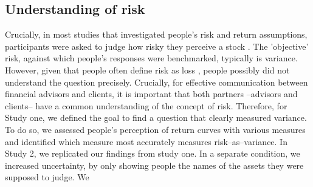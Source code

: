 \documentclass[a4paper,man, natbib,floatsintext]{apa6} %
\begin{document}
\subsection{Understanding of risk}
Crucially, in most studies that investigated people's risk and return assumptions, participants were asked to judge how risky they perceive a stock \citep[e.g.,][]{Kempf2014}. The 'objective' risk, against which people's responses were benchmarked, typically is variance. However, given that people often define risk as loss \citep{Duxbury2004, Sachse2012}, people possibly did not understand the question precisely. Crucially, for effective communication between financial advisors and clients, it is important that both partners --advisors and clients-- have a common understanding of the concept of risk. Therefore, for Study one, we defined the goal to find a question that clearly measured variance. To do so, we assessed people's perception of return curves with various measures and identified which measure most accurately measures risk--as--variance. In Study 2, we replicated our findings from study one. In a separate condition, we increased uncertainty, by only showing people the names of the assets they were supposed to judge. We 












\end{document}
